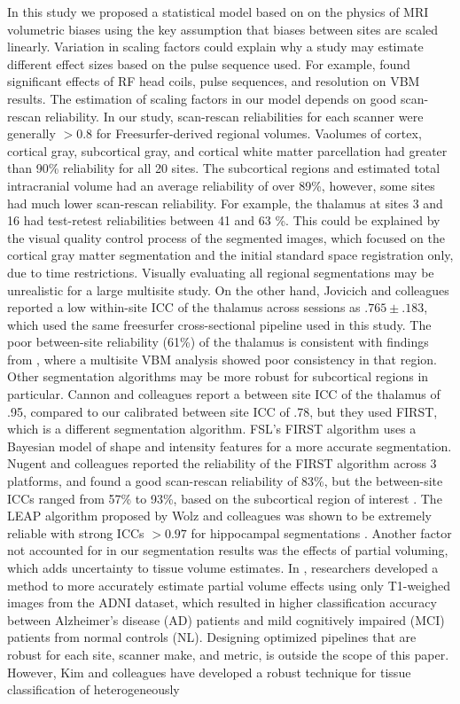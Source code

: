 In this study we proposed a statistical model based on on the physics of MRI volumetric biases using the key assumption that biases between sites are scaled linearly. Variation in scaling factors could explain why a study may estimate different effect sizes based on the pulse sequence used. For example, \cite{streitburger2014impact} found significant effects of RF head coils, pulse sequences, and resolution on VBM results. The estimation of scaling factors in our model depends on good scan-rescan reliability. In our study, scan-rescan reliabilities for each scanner were generally $>0.8$ for Freesurfer-derived regional volumes. Vaolumes of cortex, cortical gray, subcortical gray, and cortical white matter parcellation had greater than 90\% reliability for all 20 sites. The subcortical regions and estimated total intracranial volume had an average reliability of over 89\%, however, some sites had much lower scan-rescan reliability. For example, the thalamus at sites 3 and 16 had test-retest reliabilities between 41 and 63 \%. This could be explained by the visual quality control process of the segmented images, which focused on the cortical gray matter segmentation and the initial standard space registration only, due to time restrictions. Visually evaluating all regional segmentations may be unrealistic for a large multisite study. On the other hand, Jovicich and colleagues \cite{jovicich2013brain} reported a low within-site ICC of the thalamus across sessions as $.765 \pm .183$, which used the same freesurfer cross-sectional pipeline used in this study. The poor between-site reliability (61\%) of the thalamus is consistent with findings from \cite{schnack2010mapping}, where a multisite VBM analysis showed poor consistency in that region. Other segmentation algorithms may be more robust for subcortical regions in particular.  Cannon and colleagues \cite{cannon2014} report a between site ICC of the thalamus of .95, compared to our calibrated between site ICC of .78, but they used FIRST, which is a different segmentation algorithm. FSL's FIRST algorithm \cite{firstcitation} uses a Bayesian model of shape and intensity features for a more accurate segmentation. Nugent and colleagues reported the reliability of the FIRST algorithm across 3 platforms, and found a good scan-rescan reliability of 83\%, but the between-site ICCs ranged from 57\% to 93\%, based on the subcortical region of interest \cite{firstreliability}. The LEAP algorithm proposed by Wolz and colleagues \cite{Wolz_2010} was shown to be extremely reliable with strong ICCs $>0.97$ for hippocampal segmentations \cite{Wolz_2014}. Another factor not accounted for in our segmentation results was the effects of partial voluming, which adds uncertainty to tissue volume estimates. In \cite{Roche_2014}, researchers developed a method to more accurately estimate partial volume effects using only T1-weighed images from the ADNI dataset, which resulted in higher classification accuracy between Alzheimer's disease (AD) patients and mild cognitively impaired (MCI) patients from normal controls (NL). Designing optimized pipelines that are robust for each site, scanner make, and metric, is outside the scope of this paper. However, Kim and colleagues have developed a robust technique for tissue classification of heterogeneously 